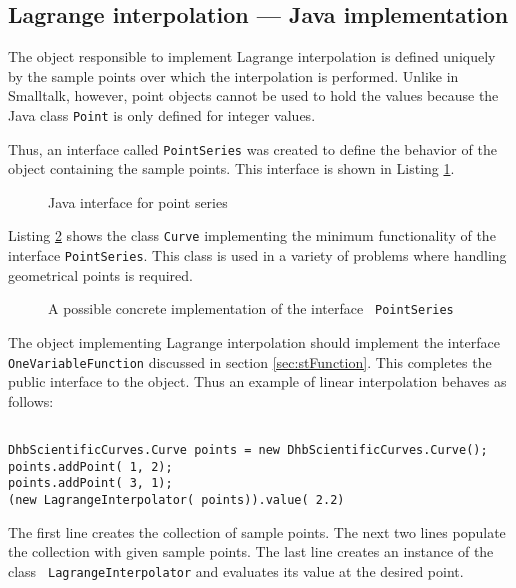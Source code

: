 \documentclass[twoside]{book}
\begin{document}
\subsection{Lagrange interpolation --- Java implementation}
\label{sec:jlagrange} The object
responsible to implement Lagrange interpolation is defined
uniquely by the sample points over which the interpolation is
performed. Unlike in Smalltalk, however, point objects cannot be
used to hold the values because the Java class {\tt Point} is only
defined for integer values.

Thus, an interface called {\tt PointSeries} was created to define
the behavior of the object containing the sample points. This
interface is shown in Listing \ref{lj:pointseries}.
\begin{figure}\begin{listing} \caption{Java interface for point series}
\label{lj:pointseries}

\end{listing}\end{figure}
Listing \ref{lj:curve} shows the class {\tt Curve} implementing
the minimum functionality of the interface {\tt PointSeries}. This
class is used in a variety of problems where handling geometrical
points is required.
\begin{figure}\begin{listing} \caption{A possible concrete implementation of the interface {\tt
PointSeries}}
\label{lj:curve}

\end{listing}\end{figure}
The object implementing Lagrange interpolation should implement
the interface {\tt OneVariableFunction} discussed in section
\ref{sec:stFunction}. This completes the public interface to the
object. Thus an example of linear interpolation behaves as
follows:
\begin{codeExample} \label{ex:lagrangeJ1}
\begin{verbatim}

DhbScientificCurves.Curve points = new DhbScientificCurves.Curve();
points.addPoint( 1, 2);
points.addPoint( 3, 1);
(new LagrangeInterpolator( points)).value( 2.2)
\end{verbatim}
\end{codeExample}
The first line creates the collection of sample points. The next
two lines populate the collection with given sample points. The
last line creates an instance of the class {\tt
LagrangeInterpolator} and evaluates its value at the desired
point.
\end{document}
